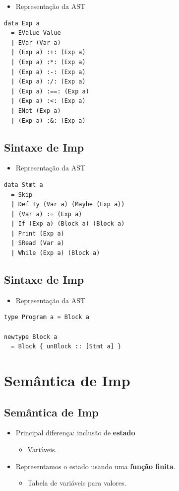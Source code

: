 \documentclass[11pt]{article}
\begin{document}
\begin{itemize}
\item Representação da AST
\end{itemize}

\begin{verbatim}
data Exp a
  = EValue Value
  | EVar (Var a)
  | (Exp a) :+: (Exp a)
  | (Exp a) :*: (Exp a)
  | (Exp a) :-: (Exp a)
  | (Exp a) :/: (Exp a)
  | (Exp a) :==: (Exp a)
  | (Exp a) :<: (Exp a)
  | ENot (Exp a)
  | (Exp a) :&: (Exp a)
\end{verbatim}
\subsection*{Sintaxe de Imp}
\label{sec:org55d4872}

\begin{itemize}
\item Representação da AST
\end{itemize}

\begin{verbatim}
data Stmt a
  = Skip
  | Def Ty (Var a) (Maybe (Exp a))
  | (Var a) := (Exp a)
  | If (Exp a) (Block a) (Block a)
  | Print (Exp a)
  | SRead (Var a)
  | While (Exp a) (Block a)
\end{verbatim}
\subsection*{Sintaxe de Imp}
\label{sec:org1a2c9a2}

\begin{itemize}
\item Representação da AST
\end{itemize}

\begin{verbatim}
type Program a = Block a

newtype Block a
  = Block { unBlock :: [Stmt a] }
\end{verbatim}
\section*{Semântica de Imp}
\label{sec:org3ea8c4e}

\subsection*{Semântica de Imp}
\label{sec:org3e4a3f1}

\begin{itemize}
\item Principal diferença: inclusão de \textbf{estado}
\begin{itemize}
\item Variáveis.
\end{itemize}

\item Representamos o estado usando uma \textbf{função finita}.
\begin{itemize}
\item Tabela de variáveis para valores.
\end{itemize}
\end{itemize}
\end{document}
